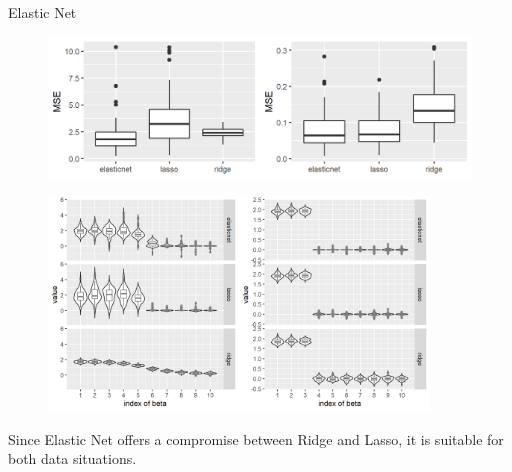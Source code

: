 \begin{vbframe} {Elastic Net}
\begin{figure}
\includegraphics[width=1\textwidth]{figure/enet_lasso_ridge_mse.png}\\
\end{figure}

\framebreak

\begin{figure}
\includegraphics[width=0.9\textwidth]{figure/enet_tradeoff.png}\\
\end{figure}


\normalsize
Since Elastic Net offers a compromise between Ridge and Lasso, it is suitable for both data situations.

\end{vbframe}



